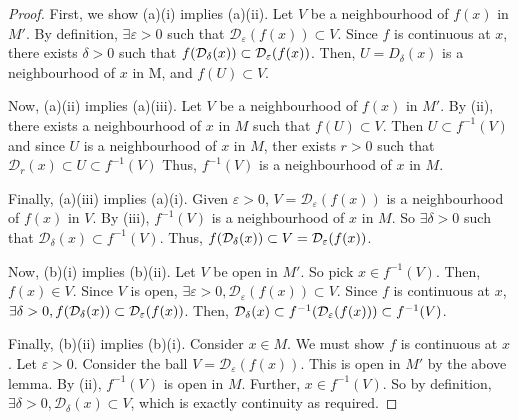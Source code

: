 \begin{proof}
	First, we show (a)(i) implies (a)(ii).
	Let \( V \) be a neighbourhood of \( f(x) \) in \( M' \).
	By definition, \( \exists \varepsilon > 0 \) such that \( \mathcal D_\varepsilon(f(x)) \subset V \).
	Since \( f \) is continuous at \( x \), there exists \( \delta > 0 \) such that \( f\qty(\mathcal D_\delta(x)) \subset \mathcal D_\varepsilon(f(x)) \).
	Then, \( U = D_\delta(x) \) is a neighbourhood of \( x \) in M, and \( f(U) \subset V \).

	Now, (a)(ii) implies (a)(iii).
	Let \( V \) be a neighbourhood of \( f(x) \) in \( M' \).
	By (ii), there exists a neighbourhood of \( x \) in \( M \) such that \( f(U) \subset V \).
	Then \( U \subset f^{-1}(V) \) and since \( U \) is a neighbourhood of \( x \) in \( M \), ther exists \( r > 0 \) such that \( \mathcal D_r(x) \subset U \subset f^{-1}(V) \)
	Thus, \( f^{-1}(V) \) is a neighbourhood of \( x \) in \( M \).

	Finally, (a)(iii) implies (a)(i).
	Given \( \varepsilon > 0 \), \( V = \mathcal D_\varepsilon(f(x)) \) is a neighbourhood of \( f(x) \) in \( V \).
	By (iii), \( f^{-1}(V) \) is a neighbourhood of \( x \) in \( M \).
	So \( \exists \delta > 0 \) such that \( \mathcal D_\delta(x) \subset f^{-1}(V) \).
	Thus, \( f\qty(\mathcal D_\delta(x)) \subset V = \mathcal D_\varepsilon(f(x)) \).

	Now, (b)(i) implies (b)(ii).
	Let \( V \) be open in \( M' \).
	So pick \( x \in f^{-1}(V) \).
	Then, \( f(x) \in V \).
	Since \( V \) is open, \( \exists \varepsilon > 0, \mathcal D_\varepsilon(f(x)) \subset V \).
	Since \( f \) is continuous at \( x \), \( \exists \delta > 0, f\qty(\mathcal D_\delta(x)) \subset \mathcal D_\varepsilon(f(x)) \).
	Then, \( \mathcal D_\delta(x) \subset f^{-1}\qty(\mathcal D_\varepsilon(f(x))) \subset f^{-1}(V) \).

	Finally, (b)(ii) implies (b)(i).
	Consider \( x \in M \).
	We must show \( f \) is continuous at \( x \).
	Let \( \varepsilon > 0 \).
	Consider the ball \( V = \mathcal D_\varepsilon(f(x)) \).
	This is open in \( M' \) by the above lemma.
	By (ii), \( f^{-1}(V) \) is open in \( M \).
	Further, \( x \in f^{-1}(V) \).
	So by definition, \( \exists \delta > 0, \mathcal D_\delta(x) \subset V \), which is exactly continuity as required.
\end{proof}

